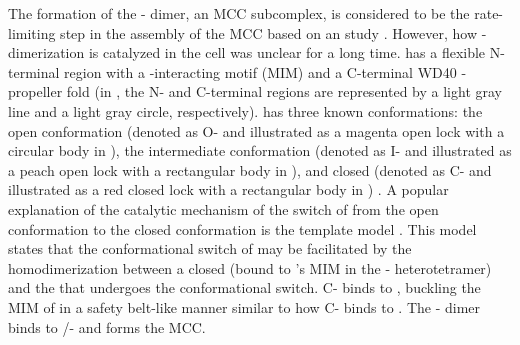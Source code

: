 The formation of the - dimer, an MCC subcomplex, is considered to be the rate-limiting step in the assembly of the MCC based on an  study \cite{Faesen2017}. However, how - dimerization is catalyzed in the cell was unclear for a long time.  has a flexible N-terminal region with a -interacting motif (MIM) and a C-terminal WD40 \textbeta{}-propeller fold \cite{hCDC20Structure} (in , the N- and C-terminal regions are represented by a light gray line and a light gray circle, respectively).  has three known conformations: the open conformation (denoted as O- and illustrated as a magenta open lock with a circular body in ), the intermediate conformation (denoted as I- and illustrated as a peach open lock with a rectangular body in ), and closed (denoted as C- and illustrated as a red closed lock with a rectangular body in ) \cite{I-MAD2}. A popular explanation of the catalytic mechanism of the switch of  from the open conformation to the closed conformation is the template model \cite{TemplateModel}. This model states that the conformational switch of  may be facilitated by the homodimerization between a closed  (bound to 's MIM in the - heterotetramer) and the  that undergoes the conformational switch. C- binds to , buckling the MIM of  in a safety belt-like manner similar to how C- binds to  \cite{Structure1GO4, SpMCC}. The - dimer binds to /- and forms the MCC.

